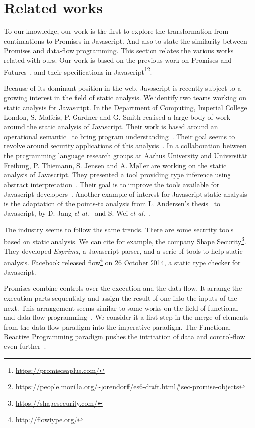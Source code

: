 \section{Related works} \label{section:related}

To our knowledge, our work is the first to explore the transformation from continuations to Promises in Javascript.
And also to state the similarity between Promises and data-flow programming.
This section relates the various works related with ours.
Our work is based on the previous work on Promises and Futures~\cite{Liskov1988}, and their specifications in Javascript\footnote{\url{https://promisesaplus.com/}}\footnote{\url{https://people.mozilla.org/~jorendorff/es6-draft.html\#sec-promise-objects}}.


Because of its dominant position in the web, Javascript is recently subject to a growing interest in the field of static analysis.
We identify two teams working on static analysis for Javascript.
In the Department of Computing, Imperial College London, S. Maffeis, P. Gardner and G. Smith realised a large body of work around the static analysis of Javascript.
Their work is based around an operational semantic~\cite{Maffeis2008} to bring program understanding~\cite{Smith2011,Gardner2012,Gardner2013,Bodin2014}.
Their goal seems to revolve around security applications of this analysis~\cite{Maffeis2009,Maffeis2009a}.
In a collaboration between the programming language research groups at Aarhus University and Universität Freiburg, P. Thiemann, S. Jensen and A. Møller are working on the static analysis of Javascript.
They presented a tool providing type inference using abstract interpretation~\cite{Thiemann2005,Jensen2009,Jensen2012}.
Their goal is to improve the tools available for Javascript developers~\cite{Andreasen}.
Another example of interest for Javascript static analysis is the adaptation of the points-to analysis from L. Andersen's thesis~\cite{Andersen1994} to Javascript, by D. Jang \textit{et al.}~\cite{Jang2009} and S. Wei \textit{et al.}~\cite{Wei2014}.

The industry seems to follow the same trends.
There are some security tools based on static analysis.
We can cite for example, the company Shape Security\footnote{\url{https://shapesecurity.com/}}.
They developed \textit{Esprima}, a Javascript parser, and a serie of tools to help static analysis.
Facebook released flow\footnote{\url{http://flowtype.org/}} on 26 October 2014, a static type checker for Javascript.

Promises combine controls over the execution and the data flow.
It arrange the execution parts sequentialy and assign the result of one into the inputs of the next.
This arrangement seems similar to some works on the field of functional and data-flow programming~\cite{Johnston2004,Cohen2012,Morrison1994,Kahn1974}.
We consider it a first step in the merge of elements from the data-flow paradigm into the imperative paradigm.
The Functional Reactive Programming paradigm pushes the intrication of data and control-flow even further~\cite{Winograd-Cort2013,Elliott1997}.

